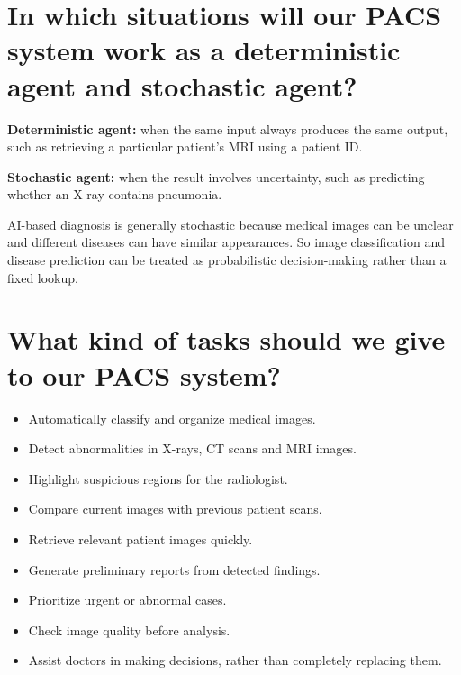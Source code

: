 \documentclass[11pt]{article}
\begin{document}
\section{In which situations will our PACS system work as a deterministic agent and stochastic agent?}

\textbf{Deterministic agent:} when the same input always produces the same output, such as retrieving a particular patient's MRI using a patient ID.

\textbf{Stochastic agent:} when the result involves uncertainty, such as predicting whether an X-ray contains pneumonia.

AI-based diagnosis is generally stochastic because medical images can be unclear and different diseases can have similar appearances. So image classification and disease prediction can be treated as probabilistic decision-making rather than a fixed lookup.

\section{What kind of tasks should we give to our PACS system?}

\begin{itemize}[noitemsep]
    \item Automatically classify and organize medical images.
    \item Detect abnormalities in X-rays, CT scans and MRI images.
    \item Highlight suspicious regions for the radiologist.
    \item Compare current images with previous patient scans.
    \item Retrieve relevant patient images quickly.
    \item Generate preliminary reports from detected findings.
    \item Prioritize urgent or abnormal cases.
    \item Check image quality before analysis.
    \item Assist doctors in making decisions, rather than completely replacing them.
\end{itemize}
\end{document}
